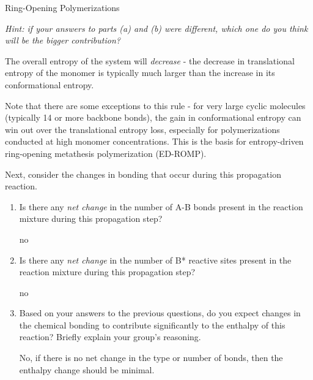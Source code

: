\begin{activity}{Ring-Opening Polymerizations}
\begin{ctqs}
\begin{enumerate}
				\emph{Hint: if your answers to parts (a) and (b) were different, which one do you think will be the bigger contribution?}
			
				\begin{solution}[1.25in]{}
					The overall entropy of the system will \emph{decrease} - the decrease in translational entropy of the monomer is typically much larger than the increase in its conformational entropy.
					
					Note that there are some exceptions to this rule - for very large cyclic molecules (typically 14 or more backbone bonds), the gain in conformational entropy can win out over the translational entropy loss, especially for polymerizations conducted at high monomer concentrations.  This is the basis for entropy-driven ring-opening metathesis polymerization (ED-ROMP).
				\end{solution}
			
		\end{enumerate}

	\question Next, consider the changes in bonding that occur during this propagation reaction.
	
		\begin{enumerate}
		
			\item Is there any \emph{net change} in the number of A-B bonds present in the reaction mixture during this propagation step?
			
				\begin{solution}[0.3in]{}
					no
				\end{solution}
	
			\item Is there any \emph{net change} in the number of B* reactive sites present in the reaction mixture during this propagation step?
			
				\begin{solution}[0.3in]{}
					no
				\end{solution}
	
			\item Based on your answers to the previous questions, do you expect changes in the chemical bonding to contribute significantly to the enthalpy of this reaction? Briefly explain your group's reasoning.
			
				\begin{solution}[1.25in]{}
					No, if there is no net change in the type or number of bonds, then the enthalpy change should be minimal.
				\end{solution}
						

\end{enumerate}
\end{ctqs}
\end{activity}
